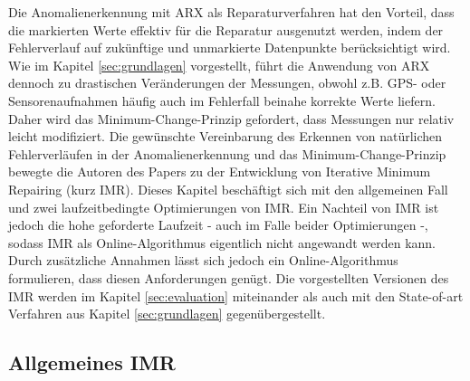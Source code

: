 Die Anomalienerkennung mit ARX als Reparaturverfahren hat den Vorteil, dass die
markierten Werte effektiv für die Reparatur ausgenutzt werden, indem der
Fehlerverlauf auf zukünftige und unmarkierte Datenpunkte berücksichtigt wird.
Wie im Kapitel \ref{sec:grundlagen} vorgestellt, führt die Anwendung von
ARX dennoch zu drastischen Veränderungen der Messungen, obwohl z.B. GPS- oder
Sensorenaufnahmen häufig auch im Fehlerfall beinahe korrekte Werte liefern.
Daher wird das Minimum-Change-Prinzip gefordert, dass Messungen nur relativ
leicht modifiziert.  Die gewünschte Vereinbarung des Erkennen von natürlichen
Fehlerverläufen in der Anomalienerkennung und das  Minimum-Change-Prinzip
bewegte die Autoren des Papers zu der Entwicklung von Iterative Minimum
Repairing (kurz IMR).  Dieses Kapitel beschäftigt sich mit den
allgemeinen Fall und zwei laufzeitbedingte Optimierungen von IMR. Ein Nachteil
von IMR ist jedoch die hohe geforderte Laufzeit - auch im Falle beider
Optimierungen -, sodass IMR als Online-Algorithmus eigentlich nicht angewandt
werden kann. Durch zusätzliche Annahmen lässt sich jedoch ein
Online-Algorithmus formulieren, dass diesen Anforderungen genügt. Die
vorgestellten Versionen des IMR werden im Kapitel \ref{sec:evaluation}
miteinander als auch mit den State-of-art Verfahren aus Kapitel
\ref{sec:grundlagen} gegenübergestellt.

\subsection{Allgemeines IMR}

